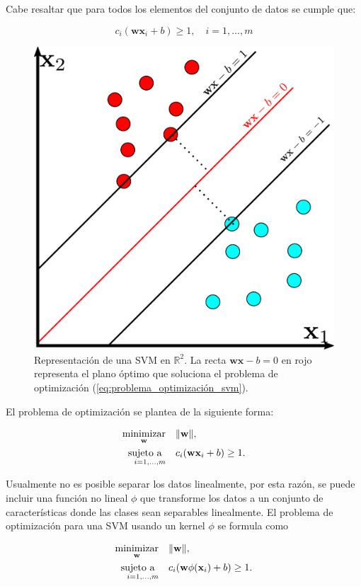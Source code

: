 Cabe resaltar que para todos los elementos del conjunto de datos se cumple que:

\begin{equation}
    c_i(\mathbf{w}\mathbf{x}_i + b) \geq 1, \quad i=1,\dots, m
\end{equation}

\begin{figure}[H]
    \centering
    \includegraphics[width=0.4\linewidth]{images/svm.pdf}
    \caption{\hspace{2mm}Representación de una SVM en $\mathbb{R}^2$. La recta $\mathbf{wx} -b = 0$ en rojo representa el plano óptimo que soluciona el problema de optimización (\ref{eq:problema_optimización_svm}).}
    \label{fig:svm}
\end{figure}

El problema de optimización se plantea de la siguiente forma:

\begin{equation}
    \begin{aligned}
        \operatorname*{minimizar}_{\mathbf{w}} & \quad \Vert \mathbf{w} \Vert, \\
        \operatorname*{sujeto \ a}_{\quad i=1,\dots, m} & \quad c_i(\mathbf{w}\mathbf{x}_i + b) \geq 1.
    \end{aligned}
    \label{eq:problema_optimización_svm}
\end{equation}

Usualmente no es posible separar los datos linealmente, por esta razón, se puede incluir una función no lineal $ \phi$ que transforme los datos a un conjunto de características donde las clases sean separables linealmente. El problema de optimización para una SVM usando un kernel $\phi$ se formula como

\begin{equation}
    \begin{aligned}
        \operatorname*{minimizar}_{\mathbf{w}} & \quad \Vert \mathbf{w} \Vert, \\
        \operatorname*{sujeto \ a}_{\quad i=1,\dots, m} & \quad c_i(\mathbf{w}\phi(\mathbf{x}_i) + b) \geq 1.
    \end{aligned}
\end{equation}


